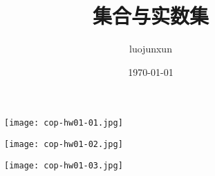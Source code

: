 \documentclass[12pt, a4paper, oneside]{ctexart}
\title{\huge\textbf{集合与实数集}}
\author{luojunxun}
\date{\today}
\begin{document}
\begin{figure}[p]

    \centerline{\texttt{[image: cop-hw01-01.jpg]}}

\end{figure}


\begin{figure}[p]

    \centerline{\texttt{[image: cop-hw01-02.jpg]}}

\end{figure}


\begin{figure}[p]

    \centerline{\texttt{[image: cop-hw01-03.jpg]}}

\end{figure}

% 
% 
\end{document}
